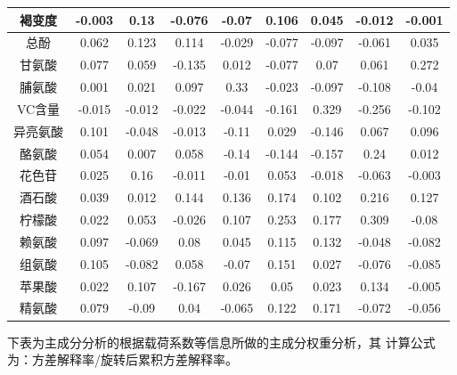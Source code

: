 \documentclass[UTF8]{ctexart}
\begin{document}
\begin{table}[!ht]
\begin{tabular}{|c|c|c|c|c|c|c|c|c|}
		褐变度         & -0.003 & 0.13   & -0.076 & -0.07  & 0.106  & 0.045  & -0.012 & -0.001 \\ \hline
		总酚           & 0.062  & 0.123  & 0.114  & -0.029 & -0.077 & -0.097 & -0.061 & 0.035  \\ \hline
		甘氨酸         & 0.077  & 0.059  & -0.135 & 0.012  & -0.077 & 0.07   & 0.061  & 0.272  \\ \hline
		脯氨酸         & 0.001  & 0.021  & 0.097  & 0.33   & -0.023 & -0.097 & -0.108 & -0.04  \\ \hline
		VC含量         & -0.015 & -0.012 & -0.022 & -0.044 & -0.161 & 0.329  & -0.256 & -0.102 \\ \hline
		异亮氨酸       & 0.101  & -0.048 & -0.013 & -0.11  & 0.029  & -0.146 & 0.067  & 0.096  \\ \hline
		酪氨酸         & 0.054  & 0.007  & 0.058  & -0.14  & -0.144 & -0.157 & 0.24   & 0.012  \\ \hline
		花色苷         & 0.025  & 0.16   & -0.011 & -0.01  & 0.053  & -0.018 & -0.063 & -0.003 \\ \hline
		酒石酸         & 0.039  & 0.012  & 0.144  & 0.136  & 0.174  & 0.102  & 0.216  & 0.127  \\ \hline
		柠檬酸         & 0.022  & 0.053  & -0.026 & 0.107  & 0.253  & 0.177  & 0.309  & -0.08  \\ \hline
		赖氨酸         & 0.097  & -0.069 & 0.08   & 0.045  & 0.115  & 0.132  & -0.048 & -0.082 \\ \hline
		组氨酸         & 0.105  & -0.082 & 0.058  & -0.07  & 0.151  & 0.027  & -0.076 & -0.085 \\ \hline
		苹果酸         & 0.022  & 0.107  & -0.167 & 0.026  & 0.05   & 0.023  & 0.134  & -0.005 \\ \hline
		精氨酸         & 0.079  & -0.09  & 0.04   & -0.065 & 0.122  & 0.171  & -0.072 & -0.056 \\ \hline
	\end{tabular}
\end{table}

\clearpage




下表为主成分分析的根据载荷系数等信息所做的主成分权重分析，其
计算公式为：方差解释率/旋转后累积方差解释率。
\end{document}
